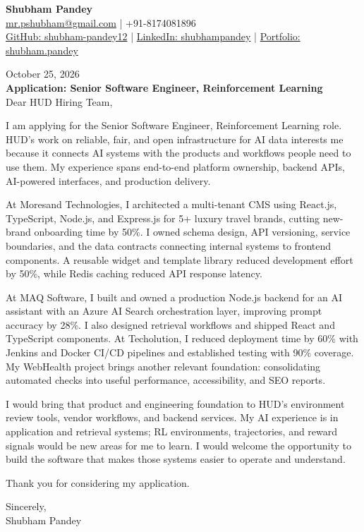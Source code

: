 \documentclass[a4paper,10pt]{article}
\begin{document}
\begin{center}
{\LARGE\textbf{Shubham Pandey}}\\[3pt]
\href{mailto:mr.pshubham@gmail.com}{mr.pshubham@gmail.com} | +91-8174081896\\[2pt]
\href{https://github.com/shubham-pandey12}{GitHub: shubham-pandey12} | \href{https://www.linkedin.com/in/shubham-pandey-a74716199/}{LinkedIn: shubhampandey} | \href{https://shubham-portfolio-mocha.vercel.app/}{Portfolio: shubham.pandey}
\end{center}
October 25, 2026\\[8pt]
\textbf{Application: Senior Software Engineer, Reinforcement Learning}\\[12pt]
Dear HUD Hiring Team,

\vspace{7pt}
I am applying for the Senior Software Engineer, Reinforcement Learning role. HUD's work on reliable, fair, and open infrastructure for AI data interests me because it connects AI systems with the products and workflows people need to use them. My experience spans end-to-end platform ownership, backend APIs, AI-powered interfaces, and production delivery.

\vspace{7pt}
At Moresand Technologies, I architected a multi-tenant CMS using React.js, TypeScript, Node.js, and Express.js for 5+ luxury travel brands, cutting new-brand onboarding time by 50\%. I owned schema design, API versioning, service boundaries, and the data contracts connecting internal systems to frontend components. A reusable widget and template library reduced development effort by 50\%, while Redis caching reduced API response latency.

\vspace{7pt}
At MAQ Software, I built and owned a production Node.js backend for an AI assistant with an Azure AI Search orchestration layer, improving prompt accuracy by 28\%. I also designed retrieval workflows and shipped React and TypeScript components. At Techolution, I reduced deployment time by 60\% with Jenkins and Docker CI/CD pipelines and established testing with 90\% coverage. My WebHealth project brings another relevant foundation: consolidating automated checks into useful performance, accessibility, and SEO reports.

\vspace{7pt}
I would bring that product and engineering foundation to HUD's environment review tools, vendor workflows, and backend services. My AI experience is in application and retrieval systems; RL environments, trajectories, and reward signals would be new areas for me to learn. I would welcome the opportunity to build the software that makes those systems easier to operate and understand.

\vspace{7pt}
Thank you for considering my application.

\vspace{7pt}
Sincerely,\\[4pt]
Shubham Pandey
\end{document}
